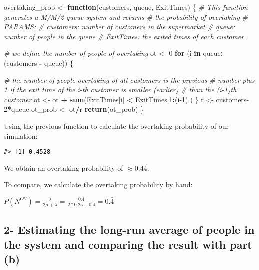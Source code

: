\documentclass[]{article}
\newenvironment{Shaded}{\begin{snugshade}}{\end{snugshade}}
\newcommand{\CommentTok}[1]{\textcolor[rgb]{0.56,0.35,0.01}{\textit{#1}}}
\newcommand{\ControlFlowTok}[1]{\textcolor[rgb]{0.13,0.29,0.53}{\textbf{#1}}}
\newcommand{\DecValTok}[1]{\textcolor[rgb]{0.00,0.00,0.81}{#1}}
\newcommand{\KeywordTok}[1]{\textcolor[rgb]{0.13,0.29,0.53}{\textbf{#1}}}
\newcommand{\NormalTok}[1]{#1}
\newcommand{\OperatorTok}[1]{\textcolor[rgb]{0.81,0.36,0.00}{\textbf{#1}}}
\newcommand{\StringTok}[1]{\textcolor[rgb]{0.31,0.60,0.02}{#1}}
\begin{document}
\begin{Shaded}
\begin{Highlighting}[]
\NormalTok{overtaking_prob <-}\StringTok{ }\ControlFlowTok{function}\NormalTok{(customers, queue, ExitTimes) \{}
  \CommentTok{# This function generates a M/M/2 queue system and returns }
  \CommentTok{# the probability of overtaking}
  \CommentTok{# PARAMS:}
  \CommentTok{# customers:   number of customers in the supermarket}
  \CommentTok{# queue:       number of people in the quene}
  \CommentTok{# ExitTimes:   the exited times of each customer}

  \CommentTok{# we define the number of people of overtaking}
\NormalTok{  ot <-}\StringTok{ }\DecValTok{0}
  \ControlFlowTok{for}\NormalTok{ (i }\ControlFlowTok{in}\NormalTok{ queue}\OperatorTok{:}\NormalTok{(customers }\OperatorTok{-}\StringTok{ }\NormalTok{queue)) \{}

    \CommentTok{# the number of people overtaking of all customers is the previous }
    \CommentTok{# number plus 1 if the exit time of the i-th customer is smaller (earlier) }
    \CommentTok{# than the (i-1)th customer }
\NormalTok{    ot <-}\StringTok{ }\NormalTok{ot }\OperatorTok{+}\StringTok{ }\KeywordTok{sum}\NormalTok{(ExitTimes[i] }\OperatorTok{<}\StringTok{ }\NormalTok{ExitTimes[}\DecValTok{1}\OperatorTok{:}\NormalTok{(i}\DecValTok{-1}\NormalTok{)])}
\NormalTok{  \}}
\NormalTok{  r <-}\StringTok{ }\NormalTok{customers}\DecValTok{-2}\OperatorTok{*}\NormalTok{queue}
\NormalTok{  ot_prob <-}\StringTok{ }\NormalTok{ot}\OperatorTok{/}\NormalTok{r}
  \KeywordTok{return}\NormalTok{(ot_prob)}
\NormalTok{\}}
\end{Highlighting}
\end{Shaded}

Using the previous function to calculate the overtaking probability of
our simulation:

\begin{verbatim}
#> [1] 0.4528
\end{verbatim}

We obtain an overtaking probability of \(\approx 0.44\).

To compare, we calculate the overtaking probability by hand:

\(P(N^{OV}) = \frac{\lambda}{2 \mu + \lambda} = \frac{0.4}{2 * 0.25 + 0.4} = 0. \bar{4}\)

\newpage

\hypertarget{estimating-the-long-run-average-of-people-in-the-system-and-comparing-the-result-with-part-b}{%
\subsection{2- Estimating the long-run average of people in the system
and comparing the result with part
(b)}\label{estimating-the-long-run-average-of-people-in-the-system-and-comparing-the-result-with-part-b}}
\end{document}
